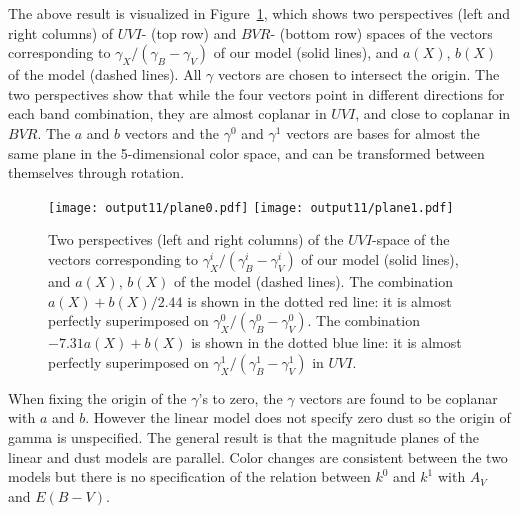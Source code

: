 \documentclass{aastex61}   	%
\begin{document}
The above result is visualized in Figure~\ref{plane:fig}, which  shows two perspectives (left and right columns) of $UVI$- (top row) and $BVR$- (bottom row) spaces
of the vectors corresponding to $\gamma_X/(\gamma_B-\gamma_V)$ of our model (solid lines),
and $a(X)$, $b(X)$ of the  model (dashed lines).  All $\gamma$ vectors are chosen to intersect the origin.
The two perspectives show that while the four vectors point in different directions for each band combination,
they are almost coplanar in $UVI$, and close to coplanar in $BVR$.  The $a$ and $b$ vectors and the $\gamma^0$ and $\gamma^1$
vectors are bases for almost the same plane in the 5-dimensional color space, and can be transformed between themselves through rotation.

\begin{figure}[htbp] %
   \centering
   \texttt{[image: output11/plane0.pdf]}
   \texttt{[image: output11/plane1.pdf]}
   \caption{
   \color{orange}
   Two perspectives (left and right columns) of the $UVI$-space
of the vectors corresponding to $\gamma^i_X/(\gamma^i_B-\gamma^i_V)$ of our model (solid lines),
   and $a(X)$, $b(X)$ of the  model (dashed lines).  The combination $a(X)+b(X)/2.44$ is shown in the dotted red
   line: it is almost perfectly superimposed on $\gamma^0_X/(\gamma^0_B-\gamma^0_V)$.   The combination $-7.31a(X)+b(X)$ is shown in the dotted blue
   line: it is
   almost  perfectly superimposed on $\gamma^1_X/(\gamma^1_B-\gamma^1_V)$ in $UVI$.  
   \label{plane:fig}}
\end{figure}


When fixing the origin of the $\gamma$'s to zero, the $\gamma$ vectors are found to be coplanar with $a$ and $b$.
However the linear model does not specify zero dust so the origin of gamma is unspecified.
The general result is that the magnitude planes of the linear and dust models are parallel.
Color changes are consistent between the two models but there is no specification of the relation between $k^0$ and $k^1$ with $A_V$ and $E(B-V)$. 
\end{document}
